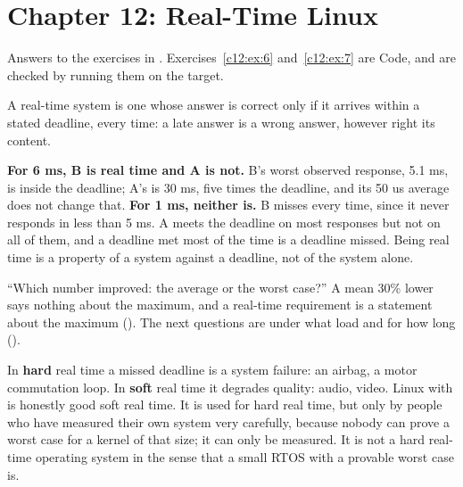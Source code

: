 
\section{Chapter 12: Real-Time Linux}
\label{sol:sec:c12}
Answers to the exercises in . Exercises~\ref{c12:ex:6} and~\ref{c12:ex:7}
are Code, and are checked by running them on the target.


 A real-time system is one whose answer is correct only if it arrives within a stated
deadline, every time: a late answer is a wrong answer, however right its content.

 \textbf{For 6 ms, B is real time and A is not.} B's worst observed response, 5.1 ms, is
inside the deadline; A's is 30 ms, five times the deadline, and its 50 us average does not change
that. \textbf{For 1 ms, neither is.} B misses every time, since it never responds in less than
5 ms. A meets the deadline on most responses but not on all of them, and a deadline met most of the
time is a deadline missed. Being real time is a property of a system against a deadline, not of the
system alone.

 ``Which number improved: the average or the worst case?'' A mean 30\% lower says nothing
about the maximum, and a real-time requirement is a statement about the maximum
(). The next questions are under what load and for how long
().

 In \textbf{hard} real time a missed deadline is a system failure: an airbag, a motor
commutation loop. In \textbf{soft} real time it degrades quality: audio, video. Linux with
 is honestly good soft real time. It is used for hard real time, but only by
people who have measured their own system very carefully, because nobody can prove a worst case
for a kernel of that size; it can only be measured. It is not a hard real-time operating system in
the sense that a small RTOS with a provable worst case is.


